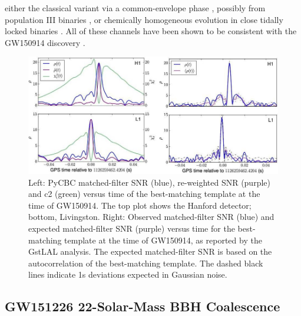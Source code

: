 \documentclass[binding=0.6cm, LaM]{sapthesis}
\begin{document}
	either the classical variant via a common-envelope phase \cite{76-81}, 
	possibly from population III binaries \cite{74, 75}, or chemically homogeneous evolution 
	in close tidally locked binaries \cite{72, 73}. 
	All of these channels have been shown to be consistent with the GW150914 discovery \cite{63-70}. 
		\begin{figure}[H]
                	\label{firstgw}
                	\includegraphics[scale=0.45]{firstgw}
                	\centering
                	\caption{Left: PyCBC matched-filter SNR (blue), re-weighted SNR (purple) and c2 (green) versus time of the best-matching template at the time of GW150914. The top plot shows the Hanford detector; bottom, Livingston. Right: Observed matched-filter SNR (blue) and expected matched-filter SNR (purple) versus time for the best-matching template at the time of GW150914, as reported by the GstLAL analysis. The expected matched-filter SNR is based on the autocorrelation of the best-matching template. The dashed black lines indicate 1s deviations expected in Gaussian noise.\cite{21}} 
                	\label{fig:firstgw}
                \end{figure}

\subsection{GW151226 22-Solar-Mass BBH Coalescence}
\end{document}
